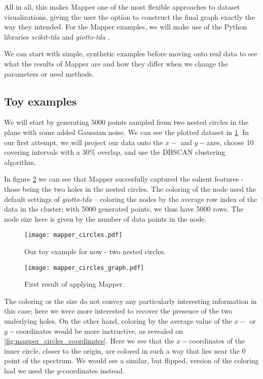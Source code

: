 All in all, this makes Mapper one of the most flexible approaches to dataset visualizations, giving the user the option to construct the final graph exactly the way they intended. For the Mapper examples, we will make use of the Python libraries \textit{scikit-tda} \cite{scikittda2019} and \textit{giotto-tda} \cite{tauzin2020giottotda}.

We can start with simple, synthetic examples before moving onto real data to see what the results of Mapper are and how they differ when we change the parameters or used methods.

\subsection{Toy examples}
We will start by generating 5000 points sampled from two nested circles in the plane with some added Gaussian noise. We can see the plotted dataset in \ref{fig:mapper_circles}. In our first attempt, we will project our data onto the $x-$ and $y-$axes, choose 10 covering intervals with a 30\% overlap, and use the DBSCAN clustering algorithm.

In figure \ref{fig:mapper_circles_graph} we can see that Mapper succesfully captured the salient features - those being the two holes in the nested circles. The coloring of the node used the default settings of \textit{giotto-tda} -- coloring the nodes by the average row index of the data in the cluster; with 5000 generated points, we thus have 5000 rows. The node size here is given by the number of data points in the node.

\begin{figure}[h!]
  \centering
  \texttt{[image: mapper\_circles.pdf]}
  \caption{Our toy example for now - two nested circles.}
  \label{fig:mapper_circles}
\end{figure}

\begin{figure}[h!]
  \centering
  \texttt{[image: mapper\_circles\_graph.pdf]}
  \caption{First result of applying Mapper.}
  \label{fig:mapper_circles_graph}
\end{figure}

The coloring or the size do not convey any particularly interesting information in this case; here we were more interested to recover the presence of the two underlying holes. On the other hand, coloring by the average value of the $x-$ or $y-$coordinates would be more instructive, as revealed on \ref{fig:mapper_circles_coordinates}. Here we see that the $x-$coordinates of the inner circle, closer to the origin, are colored in such a way that lies near the $0$ point of the spectrum. We would see a similar, but flipped, version of the coloring had we used the $y$-coordinates instead.

